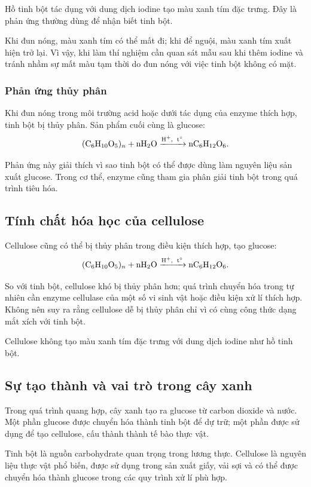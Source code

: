 Hồ tinh bột tác dụng với dung dịch iodine tạo màu xanh tím đặc trưng. Đây là phản ứng thường dùng để nhận biết tinh bột.

Khi đun nóng, màu xanh tím có thể mất đi; khi để nguội, màu xanh tím xuất hiện trở lại. Vì vậy, khi làm thí nghiệm cần quan sát mẫu sau khi thêm iodine và tránh nhầm sự mất màu tạm thời do đun nóng với việc tinh bột không có mặt.

\subsubsection*{Phản ứng thủy phân}

Khi đun nóng trong môi trường acid hoặc dưới tác dụng của enzyme thích hợp, tinh bột bị thủy phân. Sản phẩm cuối cùng là glucose:
\[
\ce{(C6H10O5)_n + nH2O ->[H^+,\ t^\circ] nC6H12O6}.
\]

Phản ứng này giải thích vì sao tinh bột có thể được dùng làm nguyên liệu sản xuất glucose. Trong cơ thể, enzyme cũng tham gia phân giải tinh bột trong quá trình tiêu hóa.

\subsection{Tính chất hóa học của cellulose}

Cellulose cũng có thể bị thủy phân trong điều kiện thích hợp, tạo glucose:
\[
\ce{(C6H10O5)_n + nH2O ->[H^+,\ t^\circ] nC6H12O6}.
\]

So với tinh bột, cellulose khó bị thủy phân hơn; quá trình chuyển hóa trong tự nhiên cần enzyme cellulase của một số vi sinh vật hoặc điều kiện xử lí thích hợp. Không nên suy ra rằng cellulose dễ bị thủy phân chỉ vì có cùng công thức dạng mắt xích với tinh bột.

Cellulose không tạo màu xanh tím đặc trưng với dung dịch iodine như hồ tinh bột.

\subsection{Sự tạo thành và vai trò trong cây xanh}

Trong quá trình quang hợp, cây xanh tạo ra glucose từ carbon dioxide và nước. Một phần glucose được chuyển hóa thành tinh bột để dự trữ; một phần được sử dụng để tạo cellulose, cấu thành thành tế bào thực vật.

Tinh bột là nguồn carbohydrate quan trọng trong lương thực. Cellulose là nguyên liệu thực vật phổ biến, được sử dụng trong sản xuất giấy, vải sợi và có thể được chuyển hóa thành glucose trong các quy trình xử lí phù hợp.

